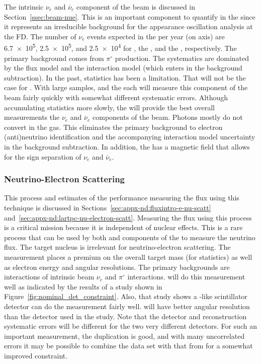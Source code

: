 The intrinsic $\nu_{e}$ and $\overline{\nu}_{e}$ component of the beam is discussed in Section~\ref{ssec:beam-nue}.  This is an important component to quantify in the   since it represents an irreducible background for the appearance oscillation analysis at the FD.  The number of  $\nu_{e}$ events expected in the  per year (on axis) are \num{6.7e5}, \num{2.5e5}, and \num{2.5e4} for , the , and the , respectively.  The primary background comes from $\pi^{\circ}$ production.  The systematics are dominated by the flux model and the interaction model (which enters in the background subtraction).  In the past, statistics has been a limitation.  That will not be the case for  .  With large samples,  and the  each will measure this component of the beam fairly quickly with somewhat different systematic errors.  Although accumulating statistics more slowly, the  will provide the best overall measurements the $\nu_{e}$ and $\overline{\nu}_{e}$ components of the beam.  Photons mostly do not convert in the gas.  This eliminates the primary background to electron (anti)neutrino identification and the accompanying interaction model uncertainty in the background subtraction.  In addition, the  has a magnetic field that allows for the sign separation of $\nu_{e}$ and $\overline{\nu}_{e}$.  


\subsubsection{Neutrino-Electron Scattering}
This process and estimates of the   performance measuring the flux using this technique is discussed in Sections~\ref{sec:appx-nd:fluxintro-e-nu-scatt} and~\ref{sec:appx-nd:lartpc-nu-electron-scatt}.  Measuring the flux using this process is a critical  mission because it is independent of nuclear effects.  This is a rare process that can be used by both  and  components of the  to measure the neutrino flux.  The target nucleus is irrelevant for neutrino-electron scattering.  The measurement places a premium on the overall target mass (for statistics) as well as electron energy and angular resolutions.  The primary backgrounds are  interactions of intrinsic beam $\nu_{e}$ and $\pi^{\circ}$ interactions.   will do this measurement well as indicated by the results of a study shown in Figure~\ref{fig:nominal_det_constraint}.  Also, that study shows a -like scintillator detector can do the measurement fairly well.   will have better angular resolution than the detector used in the study. Note that the detector and reconstruction systematic errors will be different for the two very different detectors.  For such an important measurement, the duplication is good, and with many uncorrelated errors it may be possible to combine the  data set with that from   for a somewhat improved constraint. 

